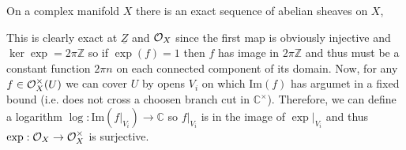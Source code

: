 \documentclass[12pt]{extarticle}
\newcommand{\Z}{\mathbb{Z}}
\renewcommand{\Im}[1]{\mathrm{Im}(#1)}
\theoremstyle{definition}
\newenvironment{definition}[1][Definition:]{\begin{trivlist}
\item[\hskip \labelsep {\bfseries #1}]}{\end{trivlist}}
\newcommand{\C}{\mathbb{C}}
\begin{document}
\begin{definition}
On a complex manifold $X$ there is an exact sequence of abelian sheaves on $X$,
\begin{center}
\end{center}
This is clearly exact at $\underline{Z}$ and $\mathcal{O}_{X}$ since the first map is obviously injective and $\ker{\exp} = 2 \pi \Z$ so if $\exp(f) = 1$ then $f$ has image in $2 \pi \Z$ and thus must be a constant function $2 \pi n$ on each connected component of its domain. Now, for any $f \in \mathcal{O}_{X}^\times(U)$ we can cover $U$ by opens $V_i$ on which $\Im{f}$ has argumet in a fixed bound (i.e. does not cross a choosen branch cut in $\C^\times$). Therefore, we can define a logarithm $\log : \Im{f|_{V_i}} \to \C$ so $f|_{V_i}$ is in the image of $\exp |_{V_i}$ and thus $\exp : \mathcal{O}_{X} \to \mathcal{O}_{X}^\times$ is surjective.
\end{definition}
\end{document}
